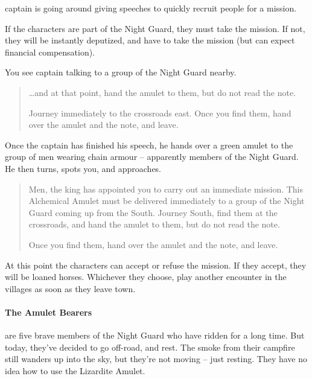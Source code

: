 \begin{multicols}{2}
\Gls{captain} is going around giving speeches to quickly recruit people for a mission.

If the characters are part of the Night Guard, they must take the mission.
If not, they will be instantly deputized, and have to take the mission (but can expect financial compensation).

\begin{boxtext}

	You see \gls{captain} talking to a group of the Night Guard nearby.

	\begin{quotation}

		\ldots and at that point, hand the amulet to them, but do not read the note.

		Journey immediately to the crossroads east.
		Once you find them, hand over the amulet and the note, and leave.

	\end{quotation}

	Once the captain has finished his speech, he hands over a green amulet to the group of men wearing chain armour -- apparently members of the Night Guard.
	He then turns, spots you, and approaches.

	\begin{quotation}

		Men, the king has appointed you to carry out an immediate mission.
		This Alchemical Amulet must be delivered immediately to a group of the Night Guard coming up from the South.
		Journey South, find them at the crossroads, and hand the amulet to them, but do not read the note.

		Once you find them, hand over the amulet and the note, and leave.

	\end{quotation}

\end{boxtext}

At this point the characters can accept or refuse the mission.  If they accept, they will be loaned horses.  Whichever they choose, play another encounter in the villages as soon as they leave town.

\paragraph{The Amulet Bearers} are five brave members of the Night Guard who have ridden for a long time.  But today, they've decided to go off-road, and rest.  The smoke from their campfire still wanders up into the sky, but they're not moving -- just resting.
They have no idea how to use the Lizardite Amulet.


\end{multicols}
